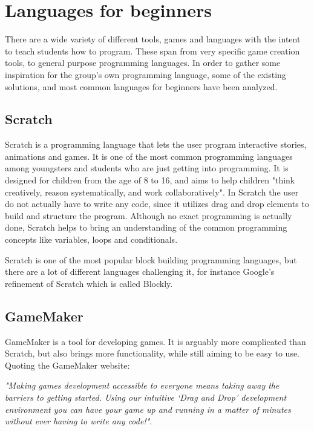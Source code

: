 \section{Languages for beginners}

There are a wide variety of different tools, games and languages with the intent to teach students how to program. 
These span from very specific game creation tools, to general purpose programming languages. 
In order to gather some inspiration for the group's own programming language, some of the existing solutions, and most common languages for beginners have been analyzed.

\subsection{Scratch}
\label{sec:Scratch}
Scratch is a programming language that lets the user program interactive stories, animations and games. 
It is one of the most common programming languages among youngsters and students who are just getting into programming. 
It is designed for children from the age of 8 to 16, and aims to help children "think creatively, reason systematically, and work collaboratively". 
In Scratch the user do not actually have to write any code, since it utilizes drag and drop elements to build and structure the program. 
Although no exact programming is actually done, Scratch helps to bring an understanding of the common programming concepts like variables, loops and conditionals\cite{ScratchWebsite}.

Scratch is one of the most popular block building programming languages, but there are a lot of different languages challenging it, for instance Google's refinement of Scratch which is called Blockly\cite{Blockly}.

\subsection{GameMaker}
GameMaker is a tool for developing games. 
It is arguably more complicated than Scratch, but also brings more functionality, while still aiming to be easy to use. 
Quoting the GameMaker website: 

\textit{"Making games development accessible to everyone means taking away the barriers to getting started. 
Using our intuitive ‘Drag and Drop’ development environment you can have your game up and running in a matter of minutes without ever having to write any code!"}\cite{GameMaker}.
 
